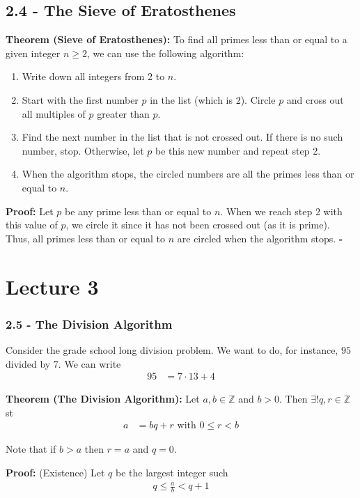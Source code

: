 \documentclass{article}
\newcommand*{\qed}{\hfill$\square$}%
\newcommand*{\txt}[1]{\text{ #1 }}%
\begin{document}
\subsection{2.4 - The Sieve of Eratosthenes}

\textbf{Theorem (Sieve of Eratosthenes):} To find all primes less than or equal to a given integer $n \geq 2$, we can use the following algorithm:
\begin{enumerate}
    \item Write down all integers from 2 to $n$.
    \item Start with the first number $p$ in the list (which is 2). Circle $p$ and cross out all multiples of $p$ greater than $p$.
    \item Find the next number in the list that is not crossed out. If there is no such number, stop. Otherwise, let $p$ be this new number and repeat step 2.
    \item When the algorithm stops, the circled numbers are all the primes less than or equal to $n$.
\end{enumerate}

\textbf{Proof:} Let $p$ be any prime less than or equal to $n$. When we reach step 2 with this value of $p$, we circle it since it has not been crossed out (as it is prime). Thus, all primes less than or equal to $n$ are circled when the algorithm stops. \qed

\section{Lecture 3}

\subsubsection{2.5 - The Division Algorithm}

Consider the grade school long division problem. We want to do, for instance, $95$ divided by $7$. We can write \begin{align*}
    95 &= 7 \cdot 13 + 4
\end{align*}

\textbf{Theorem (The Division Algorithm):} Let $a,b\in \mathbb{Z}$ and $b>0$. Then $\exists! q,r\in \mathbb{Z}$ st \begin{align*}
    a &= bq + r \txt{ with } 0 \leq r < b
\end{align*}

Note that if $b>a$ then $r=a$ and $q=0$. 

\textbf{Proof:} (Existence) Let $q$ be the largest integer such \begin{align*}
    q\leq \frac{a}{b}<q+1
\end{align*}
\end{document}
